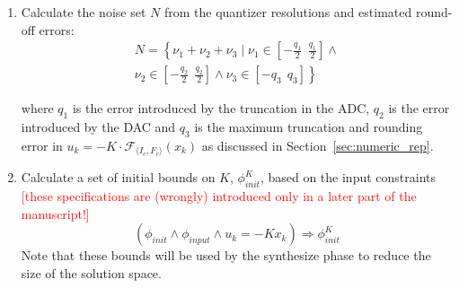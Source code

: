 \documentclass[twocolumn]{autart}    %
\newcommand{\mat}[1]{{#1}}
\begin{document}
\begin{enumerate}
\begin{enumerate}

\item Calculate the noise set $N$ from the quantizer resolutions and estimated round-off errors: %
%
\begin{equation}
\nonumber
\begin{split}
N=\left \{ \nu_1+\nu_2+ \nu_3 \mid \nu_1 \in \left[-\frac{q_1}{2}\ \ \frac{q_1}{2}\right] 
\wedge \right. \\ \left. \nu_2 \in \left[-\frac{q_2}{2}\ \ \frac{q_2}{2}\right]  \wedge  \nu_3 \in \left[-q_3\ \ q_3\right]  \right \}
\end{split}
\end{equation}

%
where  $q_1$ is the error introduced by the truncation in the ADC, $q_2$ is
the error introduced by the DAC and $q_3$ is the maximum truncation and
rounding error in $u_k=-K \cdot \mathcal{F}_{\langle I_c,F_c \rangle}(x_k)$ as
discussed in Section~\ref{sec:numeric_rep}. %

\item Calculate a set of initial bounds on $K$, $\phi_\mathit{init}^{K}$,
based on the input constraints %
%
\textcolor{red}{[these specifications are (wrongly) introduced only in a later part of the manuscript!]}
$$(\phi_\mathit{init} \wedge \phi_\mathit{input} \wedge u_k=-K x_k)
\Rightarrow \phi_\mathit{init}^{K}$$
Note that these bounds will be used by the {\sc synthesize} phase to reduce the size of the solution space. 


\end{enumerate}
\end{enumerate}
\end{document}

